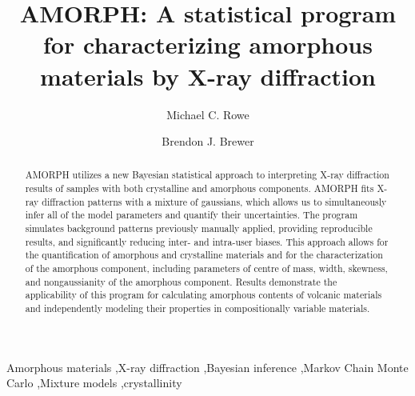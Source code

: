 \documentclass[review]{elsarticle}
\begin{document}
\begin{frontmatter}

\title{AMORPH: A statistical program for characterizing amorphous materials by X-ray diffraction}

\author[rowe]{Michael C. Rowe}
\address[rowe]{School of Environment, The University of Auckland, Private Bag 92019, Auckland 1142, New Zealand}

\author[brewer]{Brendon J. Brewer}
\address[brewer]{Department of Statistics, The University of Auckland, Private Bag 92019, Auckland 1142, New Zealand}

\begin{abstract}
AMORPH utilizes a new Bayesian statistical approach to interpreting X-ray diffraction results of samples with both crystalline and amorphous components. AMORPH fits X-ray diffraction patterns with a mixture of gaussians,
which allows us to simultaneously infer all of the model parameters and quantify their
uncertainties.
The program simulates background patterns previously manually applied, providing reproducible results, and significantly reducing inter- and intra-user biases. This approach allows for the quantification of amorphous and crystalline materials and for the characterization of the amorphous component, including parameters of centre of mass, width, skewness, and nongaussianity of the amorphous component. Results demonstrate the applicability of this program for calculating amorphous contents of volcanic materials and independently modeling their properties in compositionally variable materials.
\end{abstract}

\begin{keyword}
  Amorphous materials \sep X-ray diffraction \sep Bayesian inference \sep Markov Chain Monte Carlo \sep Mixture models \sep crystallinity
\end{keyword}

\end{frontmatter}

\linenumbers
\end{document}
